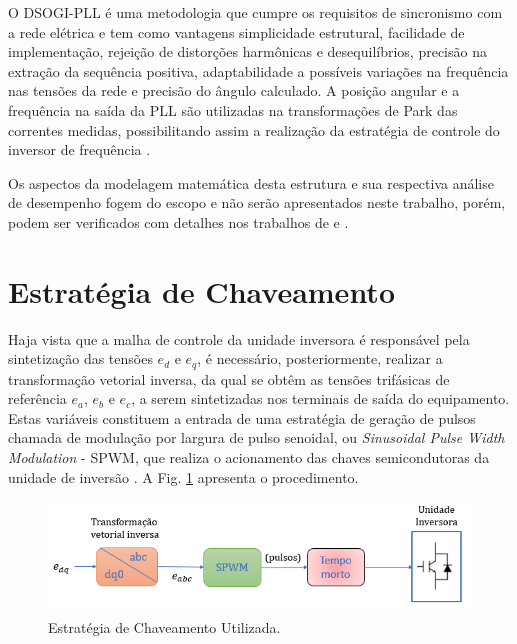 O DSOGI-PLL é uma metodologia que cumpre os requisitos de sincronismo com a rede elétrica e tem como vantagens simplicidade estrutural, facilidade de implementação, rejeição de distorções harmônicas e desequilíbrios, precisão na extração da sequência positiva, adaptabilidade a possíveis variações na frequência nas tensões da rede e precisão do ângulo calculado. A posição angular e a frequência na saída da PLL são utilizadas na transformações de Park das correntes medidas, possibilitando assim a realização da estratégia de controle do inversor de frequência \cite{DissertacaoJoao}.

Os aspectos da modelagem matemática desta estrutura e sua respectiva análise de desempenho fogem do escopo e não serão apresentados neste trabalho, porém, podem ser verificados com detalhes nos trabalhos de \cite{ArticleRodriguez} e \cite{book-remusteodorescu201b1}.

\section{Estratégia de Chaveamento}

Haja vista que a malha de controle da unidade inversora é responsável pela sintetização das tensões $e_d$ e $e_q$, é necessário, posteriormente, realizar a transformação vetorial inversa, da qual se obtêm as tensões trifásicas de referência $e_a$, $e_b$ e $e_c$, a serem sintetizadas nos terminais de saída do equipamento. Estas variáveis constituem a entrada de uma estratégia de geração de pulsos chamada de modulação por largura de pulso senoidal, ou \textit{Sinusoidal Pulse Width Modulation} - SPWM, que realiza o acionamento das chaves semicondutoras da unidade de inversão \cite{MRashid}. A Fig. \ref{fig:Estrategia_Chaveamento} apresenta o procedimento. 

\begin{figure}[!hbt]
	\begin{center}
		\includegraphics[width=0.8\columnwidth]{figuras/Estrategia_Chaveamento.PNG}
		\caption{Estratégia de Chaveamento Utilizada.}
		\label{fig:Estrategia_Chaveamento}
	\end{center}
\end{figure}

